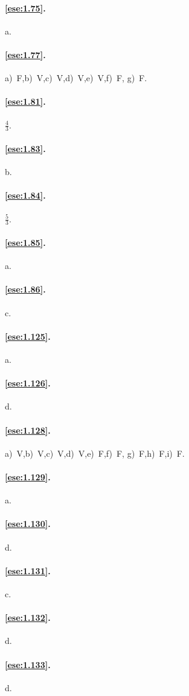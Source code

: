 \paragraph{\ref{ese:1.75}.}
a.

\paragraph{\ref{ese:1.77}.}
a)~F,\quad b)~V,\quad c)~V,\quad d)~V,\quad e)~V,\quad f)~F,\quad 
g)~F.

\paragraph{\ref{ese:1.81}.}
$\frac{4}{3}$.

\paragraph{\ref{ese:1.83}.}
b.

\paragraph{\ref{ese:1.84}.}
$\frac{5}{3}$.

\paragraph{\ref{ese:1.85}.}
a.

\paragraph{\ref{ese:1.86}.}
c.


\paragraph{\ref{ese:1.125}.}
a.

\paragraph{\ref{ese:1.126}.}
d.

\paragraph{\ref{ese:1.128}.}
a)~V,\quad b)~V,\quad c)~V,\quad d)~V,\quad e)~F,\quad f)~F,\quad 
g)~F,\quad h)~F,\quad i)~F.

\paragraph{\ref{ese:1.129}.}
a.

\paragraph{\ref{ese:1.130}.}
d.

\paragraph{\ref{ese:1.131}.}
c.

\paragraph{\ref{ese:1.132}.}
d.

\paragraph{\ref{ese:1.133}.}
d.

\endgroup
